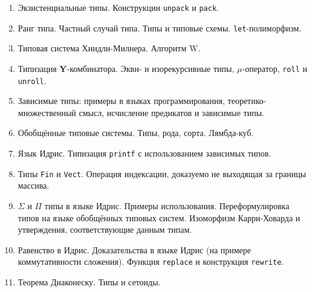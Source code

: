\documentclass[11pt,a4paper,oneside]{book}
\begin{document}
\begin{enumerate}
\item Экзистенциальные типы. Конструкции \texttt{unpack} и \texttt{pack}.
\item Ранг типа. Частный случай типа. Типы и типовые схемы. \texttt{let}-полиморфизм.
\item Типовая система Хиндли-Милнера. Алгоритм W.
\item Типизация \textbf{Y}-комбинатора. Экви- и изорекурсивные типы, $\mu$-оператор, \texttt{roll} и \texttt{unroll}.
\item Зависимые типы: примеры в языках программирования, теоретико-множественный смысл, исчисление предикатов
и зависимые типы.
\item Обобщённые типовые системы. Типы, рода, сорта. Лямбда-куб.
\item Язык Идрис. Типизация \texttt{printf} с использованием зависимых типов.
\item Типы \texttt{Fin} и \texttt{Vect}. Операция индексации, доказуемо не выходящая за границы массива.
\item $\Sigma$ и $\Pi$ типы в языке Идрис. Примеры использования.
Переформулировка типов на языке обобщённых типовых систем.
Изоморфизм Карри-Ховарда и утверждения, соответствующие данным типам.
\item Равенство в Идрис. Доказательства в языке Идрис (на примере коммутативности сложения). 
Функция \texttt{replace} и конструкция \texttt{rewrite}.
\item Теорема Диаконеску. Типы и сетоиды.
\end{enumerate}
\end{document}
